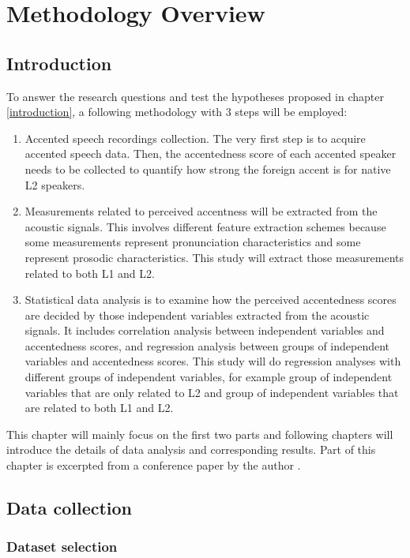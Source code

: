 \chapter{Methodology Overview}
\label{sec:methodology}
\section{Introduction}
To answer the research questions and test the hypotheses proposed in chapter \ref{introduction}, a following methodology with 3 steps will be employed:
\begin{enumerate}
\item Accented speech recordings collection. The very first step is to acquire accented speech data. Then, the accentedness score of each accented speaker needs to be collected to quantify how strong the foreign accent is for native L2 speakers.
\item Measurements related to perceived accentness will be extracted from the acoustic signals. This involves different feature extraction schemes because some measurements represent pronunciation characteristics and some represent prosodic characteristics. This study will extract those measurements related to both L1 and L2.
\item Statistical data analysis is to examine how the perceived accentedness scores are decided by those independent variables extracted from the acoustic signals. It includes correlation analysis between independent variables and accentedness scores, and regression analysis between groups of independent variables and accentedness scores. This study will do regression analyses with different groups of independent variables, for example group of independent variables that are only related to L2 and group of independent variables that are related to both L1 and L2.
\end{enumerate}
This chapter will mainly focus on the first two parts and following chapters will introduce the details of data analysis and corresponding results. Part of this chapter is excerpted from a conference paper by the author \citep{tu2018investigating}.

\section{Data collection}

\label{sec:data_collection}

\subsection{Dataset selection}

